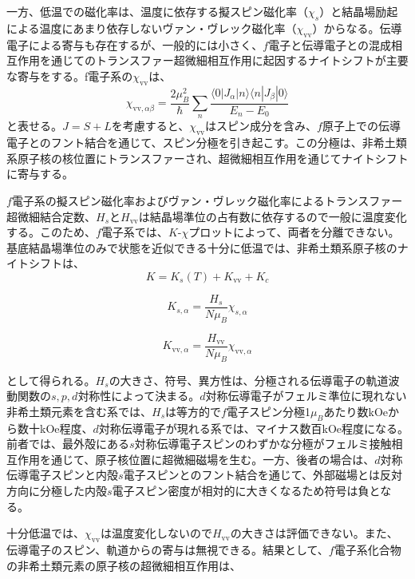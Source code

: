 \documentclass[11pt,a4j]{jreport}
\begin{document}
一方、低温での磁化率は、温度に依存する擬スピン磁化率（$\chi_s$）と結晶場励起による温度にあまり依存しないヴァン・ヴレック磁化率（$\chi_{\text{vv}}$）からなる。伝導電子による寄与も存在するが、一般的には小さく、$f$電子と伝導電子との混成相互作用を通じてのトランスファー超微細相互作用に起因するナイトシフトが主要な寄与をする。f電子系の$\chi_{\text{vv}}$は、
\begin{equation}
  \chi_{\text{vv}, \alpha \beta} = \frac{2 \mu_B^2}{\hbar} \sum_{n} \frac{\langle 0 | J_{\alpha} | n \rangle \langle n | J_{\beta} | 0 \rangle}{E_n - E_0}
\end{equation}
と表せる。$J = S + L$を考慮すると、$\chi_{\text{vv}}$はスピン成分を含み、$f$原子上での伝導電子とのフント結合を通じて、スピン分極を引き起こす。この分極は、非希土類系原子核の核位置にトランスファーされ、超微細相互作用を通じてナイトシフトに寄与する。

$f$電子系の擬スピン磁化率およびヴァン・ヴレック磁化率によるトランスファー超微細結合定数、$H_s$と$H_{\text{vv}}$は結晶場準位の占有数に依存するので一般に温度変化する。このため、$f$電子系では、$K$-$\chi$プロットによって、両者を分離できない。基底結晶場準位のみで状態を近似できる十分に低温では、非希土類系原子核のナイトシフトは、
\begin{equation}
K = K_s(T) + K_{\text{vv}} + K_c
\end{equation}

\begin{equation}
K_{s, \alpha} = \frac{H_s}{N \mu_B} \chi_{s, \alpha}
\end{equation}

\begin{equation}
K_{\text{vv}, \alpha} = \frac{H_{\text{vv}}}{N \mu_B} \chi_{\text{vv}, \alpha}
\end{equation}

として得られる。$H_s$の大きさ、符号、異方性は、分極される伝導電子の軌道波動関数の$s, p, d$対称性によって決まる。$d$対称伝導電子がフェルミ準位に現れない非希土類元素を含む系では、$H_s$は等方的で$f$電子スピン分極1$\mu_B$あたり数kOeから数十kOe程度、$d$対称伝導電子が現れる系では、マイナス数百kOe程度になる。前者では、最外殻にある$s$対称伝導電子スピンのわずかな分極がフェルミ接触相互作用を通じて、原子核位置に超微細磁場を生む。一方、後者の場合は、$d$対称伝導電子スピンと内殻$s$電子スピンとのフント結合を通じて、外部磁場とは反対方向に分極した内殻$s$電子スピン密度が相対的に大きくなるため符号は負となる。

十分低温では、$\chi_{\text{vv}}$は温度変化しないので$H_{\text{vv}}$の大きさは評価できない。また、伝導電子のスピン、軌道からの寄与は無視できる。結果として、$f$電子系化合物の非希土類元素の原子核の超微細相互作用は、
\end{document}

